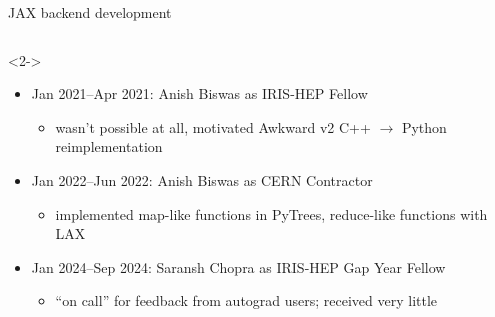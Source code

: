 \documentclass[aspectratio=169]{beamer}
\begin{document}
\begin{frame}{JAX backend development}
\large
\vspace{0.5 cm}
\begin{columns}
\end{columns}

\begin{uncoverenv}<2->
\begin{itemize}\setlength{\itemsep}{0.25 cm}
\item<2-> Jan 2021--Apr 2021: Anish Biswas as IRIS-HEP Fellow
\begin{itemize}
\item wasn't possible at all, motivated Awkward v2 C++ $\to$ Python reimplementation
\end{itemize}
\item<3-> Jan 2022--Jun 2022: Anish Biswas as CERN Contractor
\begin{itemize}
\item implemented map-like functions in PyTrees, reduce-like functions with LAX
\end{itemize}
\item<4-> Jan 2024--Sep 2024: Saransh Chopra as IRIS-HEP Gap Year Fellow
\begin{itemize}
\item ``on call'' for feedback from autograd users; received very little
\end{itemize}
\end{itemize}
\end{uncoverenv}
\end{frame}
\end{document}
